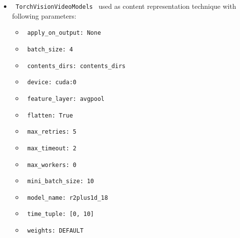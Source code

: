 \documentclass[11pt]{article}
\begin{document}
\begin{itemize}
                                                            
            \item
        \verb| TorchVisionVideoModels | used as content representation technique with following parameters:
        \begin{itemize}
                            \item
                \verb| apply_on_output: None|
                            \item
                \verb| batch_size: 4|
                            \item
                \verb| contents_dirs: contents_dirs|
                            \item
                \verb| device: cuda:0|
                            \item
                \verb| feature_layer: avgpool|
                            \item
                \verb| flatten: True|
                            \item
                \verb| max_retries: 5|
                            \item
                \verb| max_timeout: 2|
                            \item
                \verb| max_workers: 0|
                            \item
                \verb| mini_batch_size: 10|
                            \item
                \verb| model_name: r2plus1d_18|
                            \item
                \verb| time_tuple: [0, 10]|
                            \item
                \verb| weights: DEFAULT|
                    \end{itemize}
    \end{itemize}
\hfill\break
\hfill\break
\end{document}
